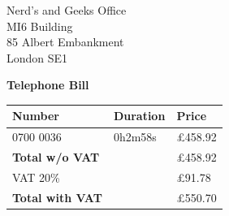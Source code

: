\documentclass[11pt,a4paper]{article}
\begin{document}
\raggedleft
Nerd's and Geeks Office\\
MI6 Building\\
85 Albert Embankment\\
London SE1\\

\raggedright
\vspace{1cm}
\Huge{\textbf{Telephone Bill}}

\vspace{1cm}

\normalsize

\begin{tabularx}{\textwidth}{X X X}
  Number & Duration & Price \\
  \hline
  0700 0036 & 0h2m58s & \pounds458.92 \\
  \hline
  \textbf{Total w/o VAT} &  & \pounds458.92 \\
  \hline
  VAT 20\% & & \pounds91.78 \\
  \hline
  \textbf{Total with VAT} & & \pounds550.70 \\
\end{tabularx}
\end{document}
